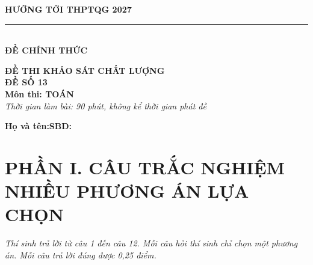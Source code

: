 \documentclass[12pt,a4paper]{article}
\begin{document}
\noindent
\begin{minipage}[t]{0.40\textwidth}
    \centering
    \textbf{HƯỚNG TỚI THPTQG 2027}\\[-2pt]
    \rule{3.2cm}{0.6pt}\\[4pt]
    \textbf{ĐỀ CHÍNH THỨC}
\end{minipage}\hfill
\begin{minipage}[t]{0.58\textwidth}
    \centering
    \textbf{ĐỀ THI KHẢO SÁT CHẤT LƯỢNG}\\
    \textbf{ĐỀ SỐ 13}\\
    \textbf{Môn thi: TOÁN}\\
    \textit{\small Thời gian làm bài: 90 phút, không kể thời gian phát đề}
\end{minipage}

\vspace{0.2cm}
\noindent
\begin{minipage}[b]{0.78\textwidth}
    \textbf{Họ và tên:}\dotfill\textbf{SBD:}\makebox[3.5cm]{\dotfill}
\end{minipage}\hfill
\begin{minipage}[b]{0.20\textwidth}
    \hfill
    \setlength{\fboxrule}{0.8pt}%
\end{minipage}
\vspace{0.2cm}

\section*{\large PHẦN I. CÂU TRẮC NGHIỆM NHIỀU PHƯƠNG ÁN LỰA CHỌN}
\textit{Thí sinh trả lời từ câu 1 đến câu 12. Mỗi câu hỏi thí sinh chỉ chọn một phương án. Mỗi câu trả lời đúng được 0,25 điểm.}
\end{document}
